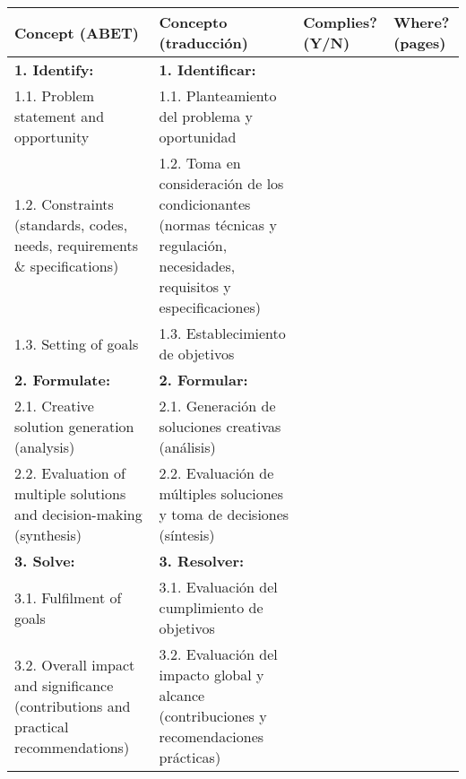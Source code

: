 \begin{table}[!ht]
    \centering
    \small
    \renewcommand{\arraystretch}{1.5}
    \begin{tabular}{|m{4.8cm}|m{4.8cm}|m{1.8cm}|m{1.8cm}|}
    \hline
    \textbf{Concept (ABET)} & \textbf{Concepto (traducción)} & \textbf{Complies? (Y/N)} & \textbf{Where? (pages)} \\ \hline\hline

    \textbf{1. Identify:} & \textbf{1. Identificar:} &  &  \\ \hline
    1.1. Problem statement and opportunity & 1.1. Planteamiento del problema y oportunidad &  &  \\ \hline
    1.2. Constraints (standards, codes, needs, requirements \& specifications) & 1.2. Toma en consideración de los condicionantes (normas técnicas y regulación, necesidades, requisitos y especificaciones) &  &  \\ \hline
    1.3. Setting of goals & 1.3. Establecimiento de objetivos &  &  \\ \hline\hline

    \textbf{2. Formulate:} & \textbf{2. Formular:} &  &  \\ \hline
    2.1. Creative solution generation (analysis) & 2.1. Generación de soluciones creativas (análisis) &  &  \\ \hline
    2.2. Evaluation of multiple solutions and decision-making (synthesis) & 2.2. Evaluación de múltiples soluciones y toma de decisiones (síntesis) &  &  \\ \hline\hline

    \textbf{3. Solve:} & \textbf{3. Resolver:} &  &  \\ \hline
    3.1. Fulfilment of goals & 3.1. Evaluación del cumplimiento de objetivos &  &  \\ \hline
    3.2. Overall impact and significance (contributions and practical recommendations) & 3.2. Evaluación del impacto global y alcance (contribuciones y recomendaciones prácticas) &  &  \\ \hline

    \end{tabular}
\end{table}


